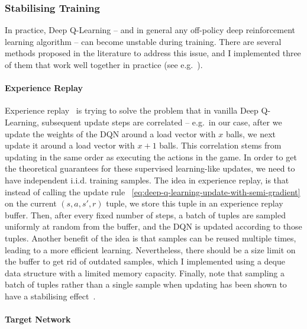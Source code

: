 \subsubsection{Stabilising Training}


In practice, Deep Q-Learning -- and in general any off-policy deep reinforcement learning algorithm -- can become unstable during training. There are several methods proposed in the literature to address this issue, and I implemented three of them that work well together in practice (see e.g.~\cite{mnih2015dqnstabilitycombined}).


\paragraph{Experience Replay}

Experience replay~\cite{lin1992experiencereplay} is trying to solve the problem that in vanilla Deep Q-Learning, subsequent update steps are correlated -- e.g.\  in our case, after we update the weights of the DQN around a load vector with $x$ balls, we next update it around a load vector with $x+1$ balls. This correlation stems from updating in the same order as executing the actions in the game. In order to get the theoretical guarantees for these supervised learning-like updates, we need to have independent i.i.d. training samples. The idea in experience replay, is that instead of calling the update rule ~\ref{eq:deep-q-learning-update-with-semi-gradient} on the current $(s, a, s', r)$ tuple, we store this tuple in an experience replay buffer. Then, after every fixed number of steps, a batch of tuples are sampled uniformly at random from the buffer, and the DQN is updated according to those tuples. Another benefit of the idea is that samples can be reused multiple times, leading to a more efficient learning. Nevertheless, there should be a size limit on the buffer to get rid of outdated samples, which I implemented using a deque data structure with a limited memory capacity. Finally, note that sampling a batch of tuples rather than a single sample when updating has been shown to have a stabilising effect~\cite{qian2020batchingsgd}.


\paragraph{Target Network}


